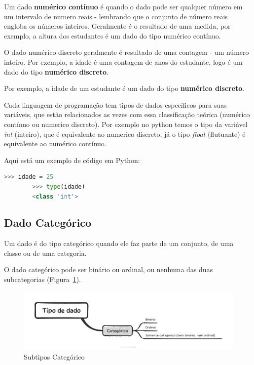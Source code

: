 \documentclass[a4paper,12pt]{book}
\begin{document}
	Um dado \textbf{numérico contínuo} é quando o dado pode ser qualquer número em um intervalo de numero reais - lembrando que o conjunto de número reais engloba os números inteiros. Geralmente é o resultado de uma medida, por exemplo, a altura dos estudantes é um dado do tipo numérico contínuo.
	
	O dado numérico discreto geralmente é resultado de uma contagem - um número inteiro. Por exemplo, a idade é uma contagem de anos do estudante, logo é um dado do tipo \textbf{numérico discreto}. 
	
	Por exemplo, a idade de um estudante é um dado do tipo \textbf{numérico discreto}. 
	
	Cada linguagem de programação tem tipos de dados específicos para suas variáveis, que estão relacionados as vezes com essa classificação teórica (numérico contínuo ou numerico discreto). Por exemplo no python temos o tipo da variável \textit{int} (inteiro), que é equivalente ao numerico discreto, já o tipo \textit{float} (flutuante) é equivalente ao numérico contínuo.
	
	Aqui está um exemplo de código em Python:
	
	\begin{lstlisting}[language=Python, caption={Exemplo de declaração de variável do tipo inteiro, equivalente ao tipo de dado numérico contínuo.}]
		>>> idade = 25
		>>> type(idade)
		<class 'int'>
	\end{lstlisting}
	
	
	
	
	\subsection{Dado Categórico}
	
	Um dado é do tipo categórico quando ele faz parte de um conjunto, de uma classe ou de uma categoria.
	
	O dado categórico pode ser binário ou ordinal, ou nenhuma das duas subcategorias (Figura~\ref{fig:categoricossubtipos}). 
	
	\begin{figure}
		\centering
		\includegraphics[width=1\linewidth]{figuras/tipo_do_dado_categorico.png}
		\caption{Subtipos Categórico}
		\label{fig:categoricossubtipos}
	\end{figure}
	
\end{document}
